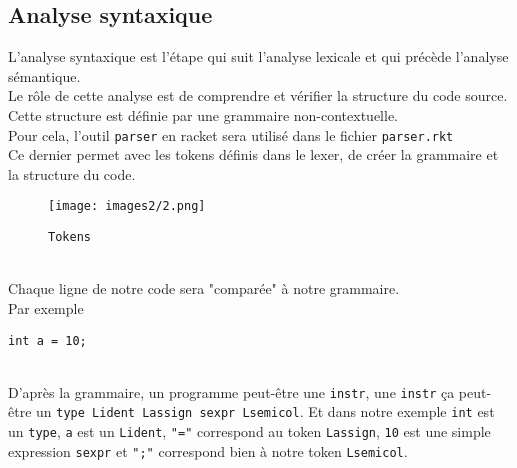 \documentclass[a4paper,10pt]{article}
\begin{document}
\begin{newpage}
\section{Analyse syntaxique}
L’analyse syntaxique est l’étape qui suit l’analyse lexicale et qui précède l’analyse sémantique.\\
Le rôle de cette analyse est de comprendre et vérifier la structure du code source. Cette structure est définie par une grammaire non-contextuelle.
\\
Pour cela, l'outil {\tt parser} en racket sera utilisé dans le fichier {\tt parser.rkt}\\
Ce dernier permet avec les tokens définis dans le lexer, de créer la grammaire et la structure du code.\\

\begin{figure}[h]
\begin{center}
    \texttt{[image: images2/2.png]}
\end{center}
\caption{\label{fig:1}{\tt Tokens}}
\end{figure}~\\

Chaque ligne de notre code sera "comparée" à notre grammaire.\\
Par exemple

\begin{verbatim}
int a = 10;
\end{verbatim}~\\
D'après la grammaire, un programme peut-être une {\tt instr}, une {\tt instr} ça peut-être un {\tt type Lident Lassign sexpr Lsemicol}. Et dans notre exemple {\tt int} est un {\tt type}, {\tt a} est un {\tt Lident}, {\tt "="} correspond au token {\tt Lassign}, {\tt 10} est une simple expression {\tt sexpr} et {\tt ";"} correspond bien à notre token {\tt Lsemicol}.

\pagestyle{plain}
\end{newpage}
\end{document}
